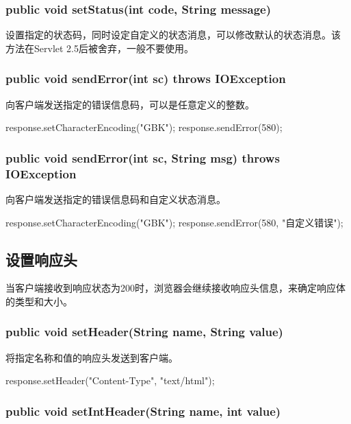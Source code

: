 \subsubsection{public void setStatus(int code, String message)}

设置指定的状态码，同时设定自定义的状态消息，可以修改默认的状态消息。该
方法在Servlet 2.5后被舍弃，一般不要使用。

\subsubsection{public void sendError(int sc) throws IOException}

向客户端发送指定的错误信息码，可以是任意定义的整数。

\begin{javaCode}
  response.setCharacterEncoding("GBK");
  response.sendError(580); 
\end{javaCode}

\subsubsection{public void sendError(int sc, String msg) throws
  IOException}

向客户端发送指定的错误信息码和自定义状态消息。

\begin{javaCode}
  response.setCharacterEncoding("GBK");
  response.sendError(580, "自定义错误"); 
\end{javaCode}

\subsection{设置响应头} 

当客户端接收到响应状态为200时，浏览器会继续接收响应头信息，来确定响应体的类型和大小。

\subsubsection{public void setHeader(String name, String value)}

将指定名称和值的响应头发送到客户端。

\begin{javaCode}
  response.setHeader("Content-Type", "text/html");  
\end{javaCode}

\subsubsection{public void setIntHeader(String name, int value)}

